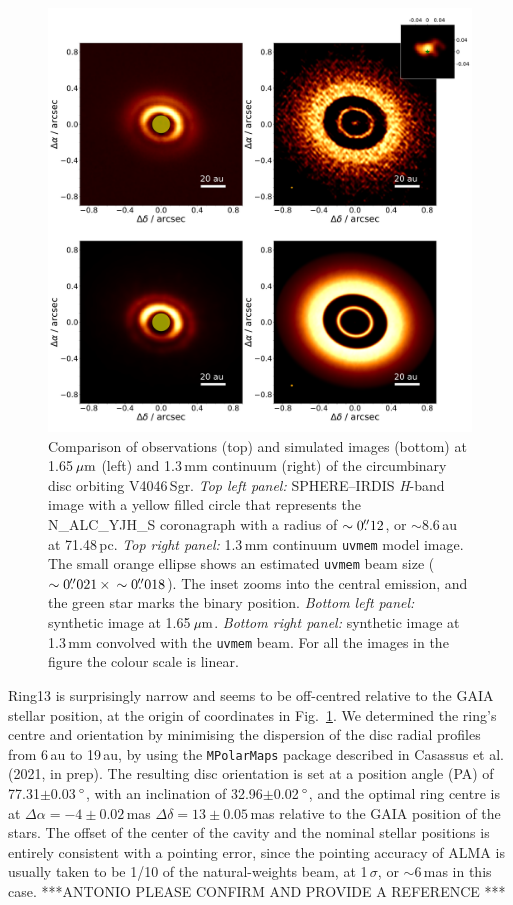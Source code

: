 \documentclass[usenatbib,times]{mnras}
\begin{document}
\begin{figure}
  \includegraphics[width=\textwidth]{hot_two_E.pdf}
  \caption{Comparison of observations (top) and simulated images (bottom) at 1.65\,$\hbox{$\mu$m}$ (left) and 1.3\,mm continuum (right) of the circumbinary disc orbiting V4046\,Sgr. \textit{Top left panel:} SPHERE--IRDIS \textit{H}-band image with a yellow filled circle that represents the N\_ALC\_YJH\_S coronagraph with a radius of $\sim0\hbox{$.\!\!^{\prime\prime}$}12$, or $\sim$8.6\,au at 71.48\,pc. \textit{Top right panel:} 1.3\,mm continuum {\tt uvmem} model image. The small orange ellipse shows an estimated {\tt uvmem} beam size ($\sim0\hbox{$.\!\!^{\prime\prime}$}021 \, \times \, \sim0\hbox{$.\!\!^{\prime\prime}$}018$). The inset zooms into the central emission, and the green star marks the binary position. \textit{Bottom left panel:} synthetic image at 1.65\,$\hbox{$\mu$m}$. \textit{Bottom right panel:} synthetic image at 1.3\,mm convolved with the {\tt uvmem} beam. For all the images in the figure the colour scale is linear.}
  \label{fig:images_vs_simulated}
\end{figure}

Ring13 is surprisingly narrow and seems to be off-centred relative to the GAIA stellar position, at the origin of coordinates in Fig.~\ref{fig:images_vs_simulated}. We determined the ring's centre and orientation by minimising the dispersion of the disc radial profiles from 6\,au to 19\,au, by using the {\tt MPolarMaps} package described in Casassus et al. (2021, in prep). The resulting disc orientation is set at a position angle  (PA) of 77.31$\pm$0.03\,$\hbox{$^\circ$}$, with an  inclination of 32.96$\pm$0.02\,$\hbox{$^\circ$}$, and the optimal ring  centre is at $\Delta \alpha = -4\pm0.02$\,mas $\Delta \delta = 13\pm0.05$\,mas relative to the GAIA position of the stars. The offset of the center of the cavity and the nominal stellar positions is entirely consistent with a pointing error, since the pointing accuracy of ALMA is usually taken to be 1/10 of the natural-weights beam, at 1\,$\sigma$, or $\sim$6\,mas in this case. ***ANTONIO PLEASE CONFIRM AND PROVIDE A REFERENCE ***
\end{document}
